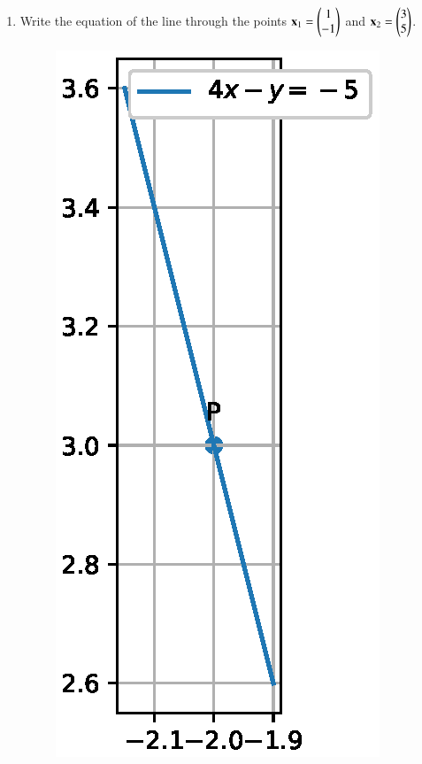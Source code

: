 \begin{enumerate}[label=\thesection.\arabic*.,ref=\thesection.\theenumi]
\item  Write the equation of the line through the points $\mathbf{x}_1=\begin{pmatrix}1\\-1\end{pmatrix}$ and $\mathbf{x}_2 = \begin{pmatrix}3\\5\end{pmatrix}$. 
\label{prob:line_plane}
\begin{figure}
\centering
\includegraphics[width=\columnwidth]{./figs/line/line_slope.eps}

\end{figure}
\end{enumerate}
